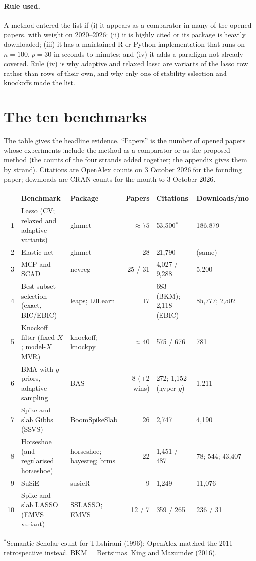 \documentclass[11pt,letterpaper]{article}
\begin{document}
\paragraph{Rule used.} A method entered the list if (i) it appears as a comparator in many of the opened papers, with weight on 2020--2026; (ii) it is highly cited or its package is heavily downloaded; (iii) it has a maintained R or Python implementation that runs on $n=100$, $p=30$ in seconds to minutes; and (iv) it adds a paradigm not already covered. Rule (iv) is why adaptive and relaxed lasso are variants of the lasso row rather than rows of their own, and why only one of stability selection and knockoffs made the list.

\section{The ten benchmarks}\label{sec:ten}

The table gives the headline evidence. ``Papers'' is the number of opened papers whose experiments include the method as a comparator or as the proposed method (the counts of the four strands added together; the appendix gives them by strand). Citations are OpenAlex counts on 3 October 2026 for the founding paper; downloads are CRAN counts for the month to 3 October 2026.

\begin{center}\footnotesize
\begin{tabular}{@{}rp{4.6cm}p{2.9cm}rp{2.6cm}p{2.1cm}@{}}
\toprule
 & Benchmark & Package & Papers & Citations & Downloads/mo \\
\midrule
1 & Lasso (CV; relaxed and adaptive variants) & glmnet & $\approx 75$ & 53{,}500$^\ast$ & 186{,}879 \\
2 & Elastic net & glmnet & 28 & 21{,}790 & (same) \\
3 & MCP and SCAD & ncvreg & 25 / 31 & 4{,}027 / 9{,}288 & 5{,}200 \\
4 & Best subset selection (exact, BIC/EBIC) & leaps; L0Learn & 17 & 683 (BKM); 2{,}118 (EBIC) & 85{,}777; 2{,}502 \\
5 & Knockoff filter (fixed-$X$; model-$X$ MVR) & knockoff; knockpy & $\approx 40$ & 575 / 676 & 781 \\
6 & BMA with $g$-priors, adaptive sampling & BAS & 8 (+2 wins) & 272; 1{,}152 (hyper-$g$) & 1{,}211 \\
7 & Spike-and-slab Gibbs (SSVS) & BoomSpikeSlab & 26 & 2{,}747 & 4{,}190 \\
8 & Horseshoe (and regularised horseshoe) & horseshoe; bayesreg; brms & 22 & 1{,}451 / 487 & 78; 544; 43{,}407 \\
9 & SuSiE & susieR & 9 & 1{,}249 & 11{,}076 \\
10 & Spike-and-slab LASSO (EMVS variant) & SSLASSO; EMVS & 12 / 7 & 359 / 265 & 236 / 31 \\
\bottomrule
\end{tabular}
\end{center}
{\footnotesize $^\ast$Semantic Scholar count for Tibshirani (1996); OpenAlex matched the 2011 retrospective instead. BKM = Bertsimas, King and Mazumder (2016).}
\end{document}
